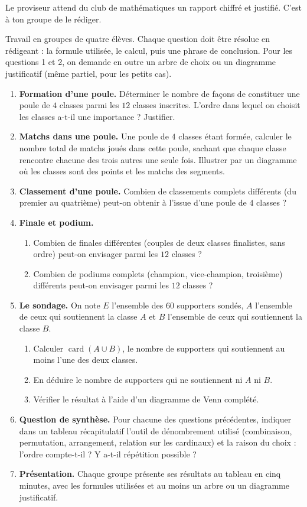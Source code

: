 \documentclass[11pt]{article}
\newcounter{popsec}
\newcounter{popsub}
\newcommand{\courssub}[1]{%
  \stepcounter{popsub}%
  \par\vspace{9pt}\noindent{\popxbold\fontsize{11.5}{13}\selectfont\color{popink}{\color{poporange}\thepopsec.\thepopsub}\hspace{6pt}#1}\par\nopagebreak\vspace{4pt}
}
\begin{document}
Le proviseur attend du club de mathématiques un rapport chiffré et justifié. C'est à ton groupe de le rédiger.

\courssub{Consignes}

Travail en groupes de quatre élèves. Chaque question doit être résolue en rédigeant : la formule utilisée, le calcul, puis une phrase de conclusion. Pour les questions 1 et 2, on demande en outre un arbre de choix ou un diagramme justificatif (même partiel, pour les petits cas).

\begin{enumerate}
\item \textbf{Formation d'une poule.} Déterminer le nombre de façons de constituer une poule de $4$ classes parmi les $12$ classes inscrites. L'ordre dans lequel on choisit les classes a-t-il une importance ? Justifier.
\item \textbf{Matchs dans une poule.} Une poule de $4$ classes étant formée, calculer le nombre total de matchs joués dans cette poule, sachant que chaque classe rencontre chacune des trois autres une seule fois. Illustrer par un diagramme où les classes sont des points et les matchs des segments.
\item \textbf{Classement d'une poule.} Combien de classements complets différents (du premier au quatrième) peut-on obtenir à l'issue d'une poule de $4$ classes ?
\item \textbf{Finale et podium.}
\begin{enumerate}
\item Combien de finales différentes (couples de deux classes finalistes, sans ordre) peut-on envisager parmi les $12$ classes ?
\item Combien de podiums complets (champion, vice-champion, troisième) différents peut-on envisager parmi les $12$ classes ?
\end{enumerate}
\item \textbf{Le sondage.} On note $E$ l'ensemble des $60$ supporters sondés, $A$ l'ensemble de ceux qui soutiennent la classe $A$ et $B$ l'ensemble de ceux qui soutiennent la classe $B$.
\begin{enumerate}
\item Calculer $\operatorname{card}(A \cup B)$, le nombre de supporters qui soutiennent au moins l'une des deux classes.
\item En déduire le nombre de supporters qui ne soutiennent ni $A$ ni $B$.
\item Vérifier le résultat à l'aide d'un diagramme de Venn complété.
\end{enumerate}
\item \textbf{Question de synthèse.} Pour chacune des questions précédentes, indiquer dans un tableau récapitulatif l'outil de dénombrement utilisé (combinaison, permutation, arrangement, relation sur les cardinaux) et la raison du choix : l'ordre compte-t-il ? Y a-t-il répétition possible ?
\item \textbf{Présentation.} Chaque groupe présente ses résultats au tableau en cinq minutes, avec les formules utilisées et au moins un arbre ou un diagramme justificatif.
\end{enumerate}
\end{document}
